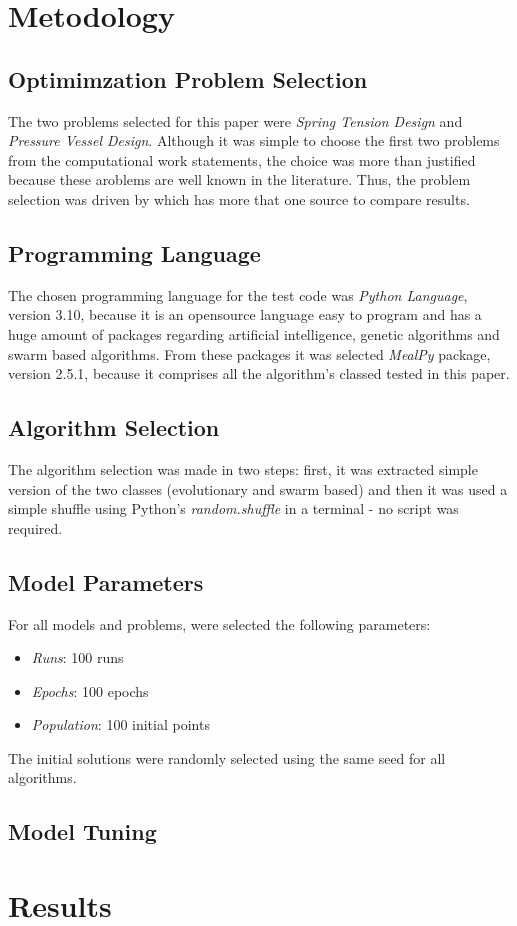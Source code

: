 \documentclass[conference]{IEEEtran}
\begin{document}
\section{Metodology}
\label{sec:metodology}

\subsection{Optimimzation Problem Selection}
The two problems selected for this paper were \textit{Spring Tension Design} and \textit{Pressure Vessel Design}. Although it was simple
to choose the first two problems from the computational work statements, the choice was more than justified because these aroblems are well
known in the literature. Thus, the problem selection was driven by which has more that one source to compare results.

\subsection{Programming Language}

The chosen programming language for the test code was \textit{Python Language}, version 3.10, because it is an opensource language easy to
program and has a huge amount of packages regarding artificial intelligence, genetic algorithms and swarm based algorithms. From these packages it
was selected \textit{MealPy} package, version 2.5.1, because it comprises all the algorithm's classed tested in this paper.

\subsection{Algorithm Selection}

The algorithm selection was made in two steps: first, it was extracted simple version of the two classes (evolutionary and swarm based) and
then it was used a simple shuffle using Python's \textit{random.shuffle} in a terminal - no script was required.

\subsection{Model Parameters}

For all models and problems, were selected the following parameters:

\begin{itemize}
    \item \textit{Runs}: 100 runs
    \item \textit{Epochs}: 100 epochs
    \item \textit{Population}: 100 initial points
\end{itemize}

The initial solutions were randomly selected using the same seed for all algorithms.

\subsection{Model Tuning}


\section{Results}
\label{sec:results}
\end{document}
